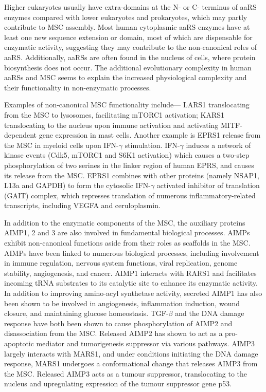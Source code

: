 Higher eukaryotes usually have extra-domains at the N- or C- terminus of aaRS enzymes compared with lower eukaryotes and prokaryotes, which may partly contribute to MSC assembly.
Most human cytoplasmic aaRS enzymes have at least one new sequence extension or domain, most of which are dispensable for enzymatic activity, suggesting they may contribute to the non-canonical roles of aaRS.
Additionally, aaRSs are often found in the nucleus of cells, where protein biosynthesis does not occur.
The additional evolutionary complexity in human aaRSs and MSC seems to explain the increased physiological complexity and their functionality in non-enzymatic processes.

Examples of non-canonical MSC functionality include--- LARS1 translocating from the MSC to lysosomes, facilitating mTORC1 activation\cite{han2012leucyl}; KARS1 translocating to the nucleus upon immune activation and activating MITF-dependent gene expression in mast cells\cite{yannay2009lysrs}.
Another example is EPRS1 release from the MSC in myeloid cells upon IFN-$\gamma$ stimulation\cite{arif2009two}.
IFN-$\gamma$ induces a network of kinase events (Cdk5, mTORC1 and S6K1 activation) which causes a two-step phosphorylation of two serines in the linker region of human EPRS, and causes its release from the MSC.
EPRS1 combines with other proteins (namely NSAP1, L13a and GAPDH) to form the cytosolic IFN-$\gamma$ activated inhibitor of translation (GAIT) complex, which represses translation of numerous inflammatory-related transcripts, including VEGFA and ceruloplasmin\cite{arif2018gait}.


In addition to the enzymatic components of the MSC, the auxiliary proteins AIMP1, 2 and 3 are also involved in fundamental biological processes.
AIMPs exhibit non-canonical functions aside from their roles as scaffolds in the MSC.
AIMPs have been linked to numerous biological processes, including involvement in immune regulation, nervous system functions, viral replication, genome stability, angiogenesis, and cancer.
AIMP1 interacts with RARS1 and facilitates incoming tRNA substrates to its catalytic site to enhance its enzymatic activity\cite{park1999precursor}.
In addition to improving amino-acyl synthetase activity, secreted AIMP1 has also been shown to be involved in angiogenesis, inflammation induction, wound closure, and maintaining glucose homeostasis\cite{park2006hormonal}.
TGF-$\beta$ and the DNA damage response have both been shown to cause phosphorylation of AIMP2 and disassociation from the MSC.
Released AIMP2 has shown to act as a pro-apoptotic mediator and tumorigenesis suppressor via various pathways\cite{zhou2020roles}.
AIMP3 largely interacts with MARS1, and under conditions initiating the DNA damage response, MARS1 undergoes a conformational change that releases AIMP3 from the MSC\cite{kwon2011dual}.
Released AIMP3 acts as a tumour suppressor, translocating to the nucleus and upregulating expression of the tumour suppressor gene p53.

